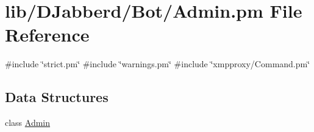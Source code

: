 \hypertarget{_admin_8pm}{
\section{lib/\-D\-Jabberd/\-Bot/\-Admin.pm \-File \-Reference}
\label{_admin_8pm}
}
{\ttfamily \#include \char`\"{}strict.\-pm\char`\"{}}\*
{\ttfamily \#include \char`\"{}warnings.\-pm\char`\"{}}\*
{\ttfamily \#include \char`\"{}xmpproxy/\-Command.\-pm\char`\"{}}\*
\subsection*{\-Data \-Structures}
\begin{DoxyCompactItemize}
\item 
class \hyperlink{class_d_jabberd_1_1_bot_1_1_admin}{\-Admin}
\end{DoxyCompactItemize}
